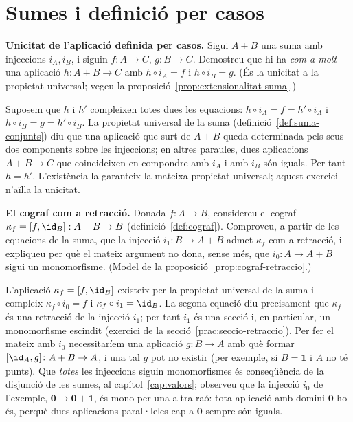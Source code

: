 \section{Sumes i definició per casos}\label{prac:sumes}

\begin{exercici}
\textbf{Unicitat de l'aplicació definida per casos.} Sigui \(A+B\) una suma amb injeccions \(i_A,i_B\), i siguin \(f:A\to C\), \(g:B\to C\). Demostreu que hi ha \emph{com a molt} una aplicació \(h:A+B\to C\) amb \(h\circ i_A=f\) i \(h\circ i_B=g\). (És la unicitat a la propietat universal; vegeu la proposició~\ref{prop:extensionalitat-suma}.)
\end{exercici}
\begin{solucio}
Suposem que \(h\) i \(h'\) compleixen totes dues les equacions: \(h\circ i_A=f=h'\circ i_A\) i \(h\circ i_B=g=h'\circ i_B\). La propietat universal de la suma (definició~\ref{def:suma-conjunts}) diu que una aplicació que surt de \(A+B\) queda determinada pels seus dos components sobre les injeccions; en altres paraules, dues aplicacions \(A+B\to C\) que coincideixen en compondre amb \(i_A\) i amb \(i_B\) són iguals. Per tant \(h=h'\). L'existència la garanteix la mateixa propietat universal; aquest exercici n'aïlla la unicitat.
\end{solucio}

\begin{exercici}
\textbf{El cograf com a retracció.} Donada \(f:A\to B\), considereu el cograf \(\kappa_f=[f,\id_B]:A+B\to B\) (definició~\ref{def:cograf}). Comproveu, a partir de les equacions de la suma, que la injecció \(i_1:B\to A+B\) admet \(\kappa_f\) com a retracció, i expliqueu per què el mateix argument no dona, sense més, que \(i_0:A\to A+B\) sigui un monomorfisme. (Model de la proposició~\ref{prop:cograf-retraccio}.)
\end{exercici}
\begin{solucio}
L'aplicació \(\kappa_f=[f,\id_B]\) existeix per la propietat universal de la suma i compleix \(\kappa_f\circ i_0=f\) i \(\kappa_f\circ i_1=\id_B\). La segona equació diu precisament que \(\kappa_f\) és una retracció de la injecció \(i_1\); per tant \(i_1\) és una secció i, en particular, un monomorfisme escindit (exercici de la secció~\ref{prac:seccio-retraccio}). Per fer el mateix amb \(i_0\) necessitaríem una aplicació \(g\colon B\to A\) amb què formar \([\id_A,g]\colon A+B\to A\), i una tal \(g\) pot no existir (per exemple, si \(B=\mathbf1\) i \(A\) no té punts). Que \emph{totes} les injeccions siguin monomorfismes és conseqüència de la disjunció de les sumes, al capítol~\ref{cap:valors}; observeu que la injecció \(i_0\) de l'exemple, \(\mathbf0\to\mathbf0+\mathbf1\), és mono per una altra raó: tota aplicació amb domini \(\mathbf0\) ho és, perquè dues aplicacions paral·leles cap a \(\mathbf0\) sempre són iguals.
\end{solucio}

